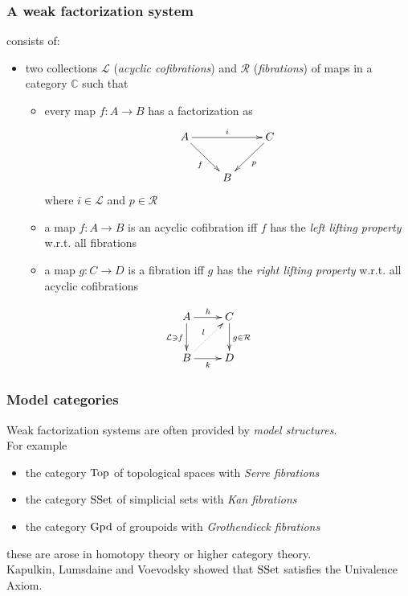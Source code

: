 \documentclass[dvipdfmx]{beamer}
\begin{document}
\begin{frame}
  \frametitle{A weak factorization system
  \cite{warren2008homotopy,awodey2007homotopy}}
  consists of:
  \begin{itemize}
    \item two collections ${\mathcal L}$ ({\it acyclic cofibrations})
      and ${\mathcal R}$ ({\it fibrations})
      of maps in a category ${\mathbb C}$
      such that
      \begin{itemize}
          \pause
        \item every map $f : A \to B$ has a factorization as
          \[
            \xymatrix{
              A \ar[rr]^{i} \ar[dr]_{f}
              &
              & C \ar[dl]^{p}
              \\
              & B
              &
            }
          \]
          where $i \in {\mathcal L}$ and $p \in {\mathcal R}$
          \pause
        \item a map $f : A \to B$ is an acyclic cofibration iff
          $f$ has the {\it left lifting property} w.r.t.
          all fibrations
        \item a map $g : C \to D$ is a fibration iff
          $g$ has the {\it right lifting property} w.r.t.
          all acyclic cofibrations
      \end{itemize}
  \end{itemize}
  \[
    \xymatrix{
      A \ar[r]^{h} \ar[d]_{ {\mathcal L} \ni f}
      & C \ar[d]^{g \in {\mathcal R}}
      \\
      B \ar[r]_{k} \ar@{.>}[ur]^{l}
      & D
    }
  \]
\end{frame}

\begin{frame}
  \frametitle{Model categories}
  Weak factorization systems are often provided
  by {\it model structures}.
  \nocite{Quillen:1967,hovey2007model}
  \\
  For example
  \begin{itemize}
    \item the category ${\rm Top}$ of topological spaces
      with {\it Serre fibrations}
    \item the category ${\rm SSet}$ of simplicial sets
      with {\it Kan fibrations}
    \item the category ${\rm Gpd}$ of groupoids
      with {\it Grothendieck fibrations}
  \end{itemize}
  these are arose in homotopy theory or
  higher category theory.
  \\
  Kapulkin, Lumsdaine and Voevodsky showed that
  ${\rm SSet}$ satisfies the Univalence Axiom.
  \cite{kapulkin2012simplicial,kapulkin2012univalence}
\end{frame}
\end{document}
